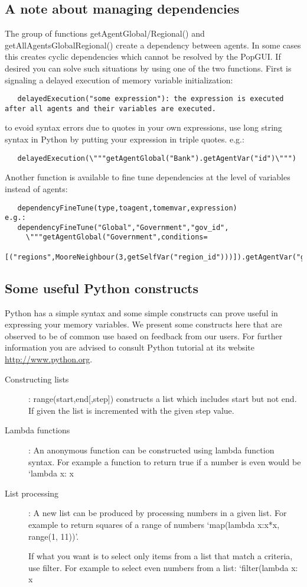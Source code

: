 \subsection{A note about managing dependencies}
 The group of functions getAgentGlobal/Regional() and getAllAgentsGlobalRegional() create a dependency between agents.
 In some cases this creates cyclic dependencies which cannot be resolved by the PopGUI. If desired you can
 solve such situations by using one of the two functions. First is signaling a delayed execution of memory variable initialization:
\begin{verbatim}
   delayedExecution("some expression"): the expression is executed after all agents and their variables are executed. 
\end{verbatim}
 to evoid syntax errors due to quotes in your own expressions, use long string syntax in Python by putting
 your expression in triple quotes. e.g.:
\begin{verbatim}
   delayedExecution(\"""getAgentGlobal("Bank").getAgentVar("id")\""")
\end{verbatim}
 
 Another function is available to fine tune dependencies at the level of variables instead of agents:
\begin{verbatim}
   dependencyFineTune(type,toagent,tomemvar,expression)
e.g.:
   dependencyFineTune("Global","Government","gov_id",
     \"""getAgentGlobal("Government",conditions=
     [("regions",MooreNeighbour(3,getSelfVar("region_id")))]).getAgentVar("gov_id")""")  
\end{verbatim}


\subsection{Some useful Python constructs}
Python has a simple syntax and some simple constructs can prove useful in expressing your memory variables. We present some constructs here that are observed to be of common use based on feedback from our users. For further information you are advised to consult Python tutorial at its website \url{http://www.python.org}.
\begin{description}
\item[Constructing lists]: range(start,end[,step]) constructs a list which includes start but not end. If given the list is incremented with the given step value.
\item[Lambda functions]: An anonymous function can be constructed using lambda function syntax. For example a function to return true if a number is even would be `lambda x: x%
\item[List processing]: A new list can be produced by processing numbers in a given list. For example to return squares of a range of numbers `map(lambda x:x*x, range(1, 11))'.

If what you want is to select only items from a list that match a criteria, use filter. For example to select even numbers from a list: `filter(lambda x: x%

\end{description}
